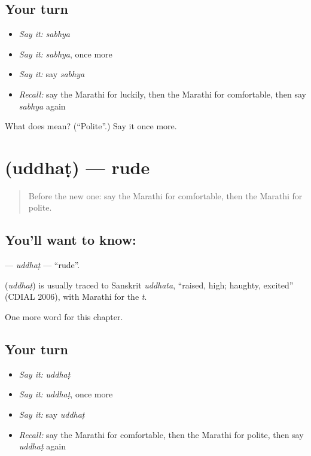 \subsection*{Your turn}
\begin{itemize}
\raggedright
  \item \emph{Say it:} \emph{sabhya}
  \item \emph{Say it:} \emph{sabhya}, once more
  \item \emph{Say it:} say \emph{sabhya}
  \item \emph{Recall:} say the Marathi for luckily, then the Marathi for comfortable, then say \emph{sabhya} again
\end{itemize}

\begin{tcolorbox}[breakable,colback=teal!4,colframe=teal!35!black,title={Before you move on}]
What does  mean? (\textquotedblleft{}Polite\textquotedblright{}.) Say it once more.
\end{tcolorbox}
\section[\texorpdfstring{\mr{उद्धट} (uddhaṭ)}{उद्धट (uddhaṭ)}]{ (uddhaṭ) — rude}

\label{lesson:MR-C174-uddhat}



\begin{quote}
Before the new one: say the Marathi for comfortable, then the Marathi for polite.
\end{quote}

\subsection*{You'll want to know: }
\textbf{} — \emph{uddhaṭ} — \textquotedblleft{}rude\textquotedblright{}.

\begin{cousinweb}
\textbf{} (\emph{uddhaṭ}) is usually traced to Sanskrit \emph{uddhata}, \textquotedblleft{}raised, high; haughty, excited\textquotedblright{} (CDIAL 2006), with Marathi \textbf{} for the \emph{t}.
\end{cousinweb}

\begin{grammarlens}[title={What you've built}]
One more word for this chapter.
\end{grammarlens}

\subsection*{Your turn}
\begin{itemize}
\raggedright
  \item \emph{Say it:} \emph{uddhaṭ}
  \item \emph{Say it:} \emph{uddhaṭ}, once more
  \item \emph{Say it:} say \emph{uddhaṭ}
  \item \emph{Recall:} say the Marathi for comfortable, then the Marathi for polite, then say \emph{uddhaṭ} again
\end{itemize}

